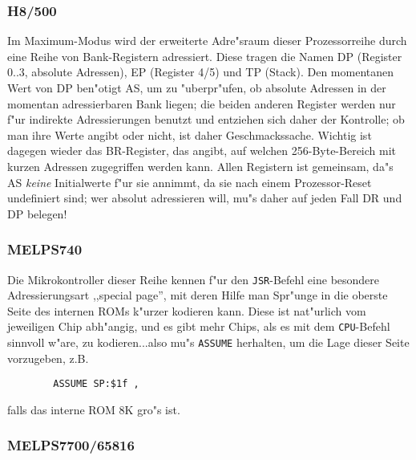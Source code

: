 \documentclass[12pt,a4paper,twoside]{report}
\newcommand{\tty}[1]{{\tt #1}}
\begin{document}

\subsubsection{H8/500}

Im Maximum-Modus wird der erweiterte Adre"sraum dieser Prozessorreihe
durch eine Reihe von Bank-Registern adressiert.  Diese tragen die
Namen DP (Register 0..3, absolute Adressen), EP (Register 4/5) und
TP (Stack).  Den momentanen Wert von DP ben"otigt AS, um zu "uberpr"ufen,
ob absolute Adressen in der momentan adressierbaren Bank liegen;
die beiden anderen Register werden nur f"ur indirekte Adressierungen
benutzt und entziehen sich daher der Kontrolle; ob man ihre Werte
angibt oder nicht, ist daher Geschmackssache.  Wichtig ist dagegen
wieder das BR-Register, das angibt, auf welchen 256-Byte-Bereich
mit kurzen Adressen zugegriffen werden kann.  Allen Registern ist
gemeinsam, da"s AS {\em keine} Initialwerte f"ur sie annimmt, da sie nach
einem Prozessor-Reset undefiniert sind; wer absolut adressieren
will, mu"s daher auf jeden Fall DR und DP belegen!


\subsubsection{MELPS740}

Die Mikrokontroller dieser Reihe kennen f"ur den \tty{JSR}-Befehl eine
besondere Adressierungsart ,,special page'', mit deren Hilfe man Spr"unge
in die oberste Seite des internen ROMs k"urzer kodieren kann.  Diese
ist nat"urlich vom jeweiligen Chip abh"angig, und es gibt mehr Chips,
als es mit dem \tty{CPU}-Befehl sinnvoll w"are, zu kodieren...also mu"s
\tty{ASSUME} herhalten, um die Lage dieser Seite vorzugeben, z.B.
\begin{verbatim}
        ASSUME SP:$1f ,
\end{verbatim}
falls das interne ROM 8K gro"s ist.


\subsubsection{MELPS7700/65816}
\end{document}
